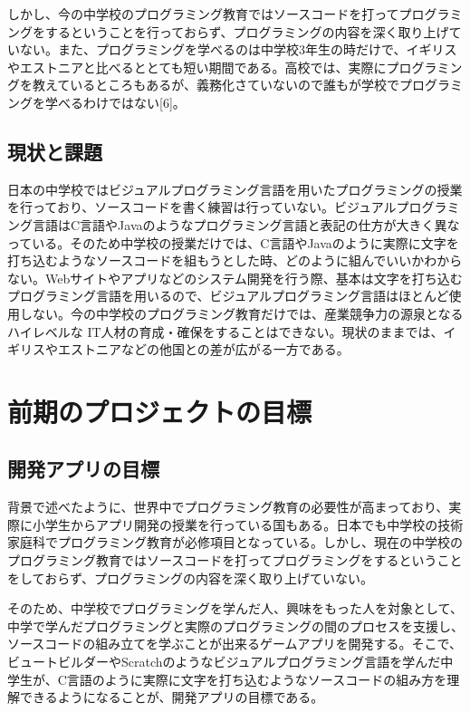 \documentclass[openany,11pt,papersize]{jsbook}
\begin{document}
しかし、今の中学校のプログラミング教育ではソースコードを打ってプログラミングをするということを行っておらず、プログラミングの内容を深く取り上げていない。また、プログラミングを学べるのは中学校3年生の時だけで、イギリスやエストニアと比べるととても短い期間である。高校では、実際にプログラミングを教えているところもあるが、義務化さていないので誰もが学校でプログラミングを学べるわけではない[6]。

\section{現状と課題}
日本の中学校ではビジュアルプログラミング言語を用いたプログラミングの授業を行っており、ソースコードを書く練習は行っていない。ビジュアルプログラミング言語はC言語やJavaのようなプログラミング言語と表記の仕方が大きく異なっている。そのため中学校の授業だけでは、C言語やJavaのように実際に文字を打ち込むようなソースコードを組もうとした時、どのように組んでいいかわからない。Webサイトやアプリなどのシステム開発を行う際、基本は文字を打ち込むプログラミング言語を用いるので、ビジュアルプログラミング言語はほとんど使用しない。今の中学校のプログラミング教育だけでは、産業競争力の源泉となるハイレベルな IT人材の育成・確保をすることはできない。現状のままでは、イギリスやエストニアなどの他国との差が広がる一方である。

\chapter{前期のプロジェクトの目標}
\section{開発アプリの目標}
背景で述べたように、世界中でプログラミング教育の必要性が高まっており、実際に小学生からアプリ開発の授業を行っている国もある。日本でも中学校の技術家庭科でプログラミング教育が必修項目となっている。しかし、現在の中学校のプログラミング教育ではソースコードを打ってプログラミングをするということをしておらず、プログラミングの内容を深く取り上げていない。
\par
そのため、中学校でプログラミングを学んだ人、興味をもった人を対象として、中学で学んだプログラミングと実際のプログラミングの間のプロセスを支援し、ソースコードの組み立てを学ぶことが出来るゲームアプリを開発する。そこで、ビュートビルダーやScratchのようなビジュアルプログラミング言語を学んだ中学生が、C言語のように実際に文字を打ち込むようなソースコードの組み方を理解できるようになることが、開発アプリの目標である。
\end{document}
